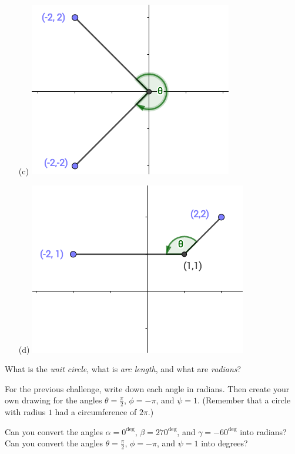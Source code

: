 \documentclass[12pt, a4paper]{article}
\begin{document}
\begin{ex}
\begin{minipage}{0.5\linewidth}
    \begin{enumerate}
    \item[(c)] \includegraphics[scale=0.40]{images/angle-3-digital}
    \item[(d)] \includegraphics[scale=0.40]{images/angle-4-digital}
    \end{enumerate}
  \end{minipage}
\end{ex}
\begin{defi}
  What is the \emph{unit circle}, what is \emph{arc length}, and what
  are \emph{radians}?
\end{defi}
\vs\vs
\begin{ex}
  For the previous challenge, write down each angle in radians.  Then
  create your own drawing for the angles $\theta = \frac{\pi}{2}$,
  $\phi = -\pi$, and $\psi = 1$. (Remember that a circle with radius
  \(1\) had a circumference of \(2\pi\).)
\end{ex}
\begin{thrm}
\end{thrm}
\vs\vs\vs
\begin{ex}
  Can you convert the angles $\alpha = 0^\deg$, $\beta = 270^\deg$, and $\gamma = -60^\deg$ into radians?  Can you convert the angles $\theta = \frac{\pi}{2}$, $\phi = -\pi$, and $\psi = 1$ into degrees?
\end{ex}
\end{document}
